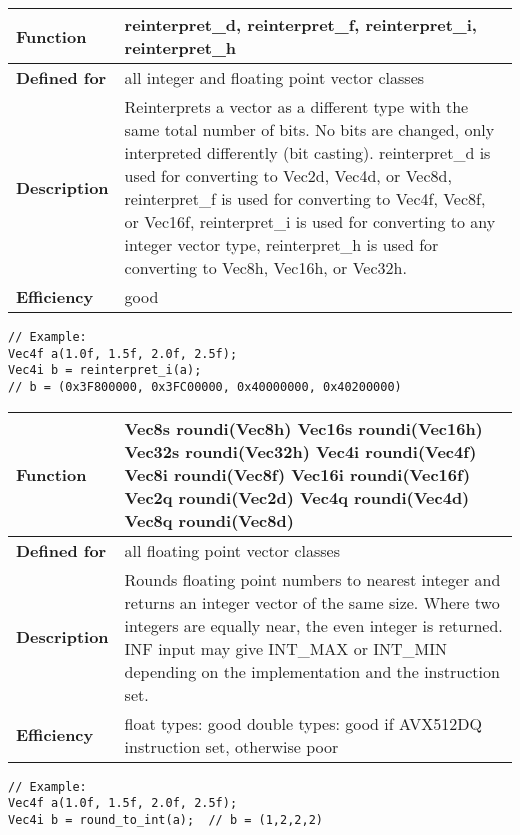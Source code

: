 \documentclass[vcl_manual.tex]{subfiles}
\begin{document}
\begin{tabular}{|p{30mm}|p{120mm}|}
\hline
\bfseries Function & reinterpret\_d, reinterpret\_f, reinterpret\_i, reinterpret\_h \\ \hline
\bfseries Defined for & all integer and floating point vector classes \\ \hline
\bfseries Description & Reinterprets a vector as a different type with the same total number of bits. No bits are changed, only interpreted differently (bit casting).\newline
reinterpret\_d is used for converting to Vec2d, Vec4d, or Vec8d, \newline
reinterpret\_f is used for converting to Vec4f, Vec8f, or Vec16f, \newline
reinterpret\_i is used for converting to any integer vector type, \newline
reinterpret\_h is used for converting to Vec8h, Vec16h, or Vec32h. \\ \hline
\bfseries Efficiency & good \\ \hline
\end{tabular}
\begin{lstlisting}[frame=none]
// Example:
Vec4f a(1.0f, 1.5f, 2.0f, 2.5f);
Vec4i b = reinterpret_i(a); 
// b = (0x3F800000, 0x3FC00000, 0x40000000, 0x40200000)
\end{lstlisting}

\label{roundToInt}
\begin{tabular}{|p{30mm}|p{120mm}|}
\hline
\bfseries Function & 
Vec8s roundi(Vec8h) \newline
Vec16s roundi(Vec16h) \newline
Vec32s roundi(Vec32h) \newline
Vec4i roundi(Vec4f) \newline
Vec8i roundi(Vec8f) \newline
Vec16i roundi(Vec16f) \newline
Vec2q roundi(Vec2d) \newline
Vec4q roundi(Vec4d) \newline
Vec8q roundi(Vec8d) \\ \hline
\bfseries Defined for & all floating point vector classes \\ \hline
\bfseries Description & Rounds floating point numbers to nearest integer and returns an integer vector of the same size. Where two integers are equally near, the even integer is returned. \newline
INF input may give INT\_MAX or INT\_MIN depending on the implementation and the instruction set.\\ \hline
\bfseries Efficiency & float types: good \newline
double types: good if AVX512DQ instruction set, otherwise poor \\ \hline
\end{tabular}
\begin{lstlisting}[frame=none]
// Example:
Vec4f a(1.0f, 1.5f, 2.0f, 2.5f);
Vec4i b = round_to_int(a);  // b = (1,2,2,2)
\end{lstlisting}
\end{document}
